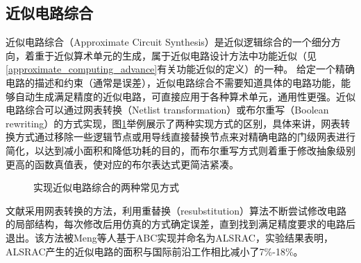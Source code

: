 \subsection{近似电路综合}

近似电路综合（Approximate Circuit Synthesis）\cite{AC:ALS:survey}是近似逻辑综合的一个细分方向，着重于近似算术单元的生成，属于近似电路设计方法中功能近似（见\ref{approximate_computing_advance}有关功能近似的定义）的一种。
给定一个精确电路的描述和约束（通常是误差），近似电路综合不需要知道具体的电路功能，能够自动生成满足精度的近似电路，可直接应用于各种算术单元，通用性更强。近似电路综合可以通过网表转换（Netlist transformation）或布尔重写（Boolean rewriting）的方式实现，图\ref{AC:ALS:survey_ACS_two_methods}举例展示了两种实现方式的区别，具体来讲，网表转换方式通过移除一些逻辑节点或用导线直接替换节点来对精确电路的门级网表进行简化，以达到减小面积和降低功耗的目的，而布尔重写方式则着重于修改抽象级别更高的函数真值表，使对应的布尔表达式更简洁紧凑。
\begin{figure}[!htb]
    \centering
\caption{实现近似电路综合的两种常见方式}
\label{AC:ALS:survey_ACS_two_methods}
\end{figure}

文献\cite{AC:ALS:ALSRAC}采用网表转换的方法，利用重替换（resubstitution）算法\cite{LS:resub}不断尝试修改电路的局部结构，每次修改后用仿真的方式确定误差，直到找到满足精度要求的电路后退出。该方法被Meng等人基于ABC\cite{LS:ABC}实现并命名为ALSRAC，实验结果表明，ALSRAC产生的近似电路的面积与国际前沿工作相比减小了7\%-18\%。

